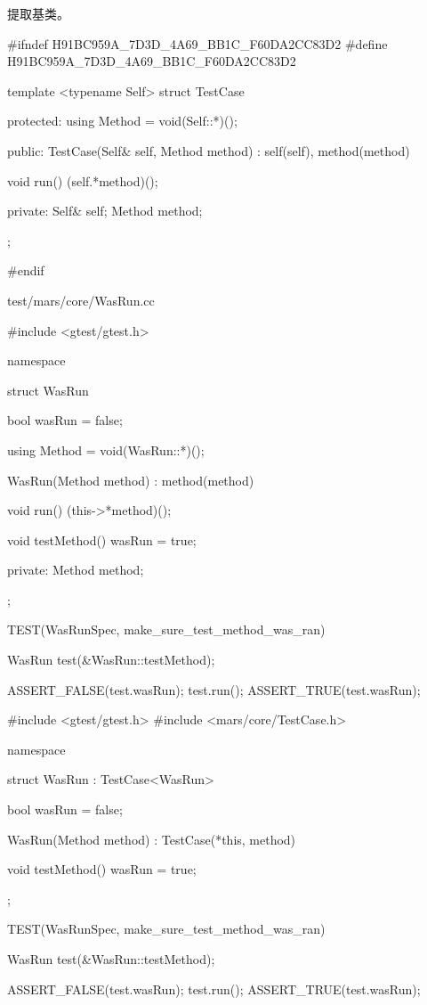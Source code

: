 提取基类。

\begin{nodiff}
\begin{c++}
#ifndef H91BC959A_7D3D_4A69_BB1C_F60DA2CC83D2
#define H91BC959A_7D3D_4A69_BB1C_F60DA2CC83D2

template <typename Self>
struct TestCase {
protected:
  using Method = void(Self::*)();

public:
  TestCase(Self& self, Method method)
    : self(self), method(method) {}

  void run() {
    (self.*method)();
  }

private:
  Self& self;
  Method method;
};

#endif
\end{c++}
\end{nodiff}

\begin{diff}{test/mars/core/WasRun.cc}
\begin{minicpp}
#include <gtest/gtest.h>

namespace {
  struct WasRun {
    bool wasRun = false;

    using Method = void(WasRun::*)();

    WasRun(Method method) : method(method) {
    }

    void run() {
      (this->*method)();
    }

    void testMethod() {
      wasRun = true;
    }

  private:
    Method method;
  };
}

TEST(WasRunSpec, make_sure_test_method_was_ran) {
  WasRun test(&WasRun::testMethod);

  ASSERT_FALSE(test.wasRun);
  test.run();
  ASSERT_TRUE(test.wasRun);
}
\end{minicpp}
\tcblower
\begin{minicpp}
#include <gtest/gtest.h>
#include <mars/core/TestCase.h>

namespace {
  struct WasRun : TestCase<WasRun> {
    bool wasRun = false;

    WasRun(Method method) : TestCase(*this, method) {
    }

    void testMethod() {
      wasRun = true;
    }
  };
}

TEST(WasRunSpec, make_sure_test_method_was_ran) {
  WasRun test(&WasRun::testMethod);

  ASSERT_FALSE(test.wasRun);
  test.run();
  ASSERT_TRUE(test.wasRun);
}
\end{minicpp}
\end{diff}

